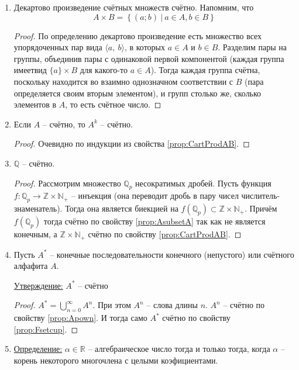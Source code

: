 \documentclass[a4paper, 12pt]{article}
\newcommand{\definition}{\underline{Определение:} }
\newcommand{\statement}{\underline{Утверждение:} }
\newcommand{\Z}{\mathbb{Z}}
\newcommand{\N}{\mathbb{N}}
\newcommand{\Q}{\mathbb{Q}}
\newcommand{\R}{\mathbb{R}}
\begin{document}
\begin{enumerate}
      \item
          \label{prop:CartProdAB}
          Декартово произведение счётных множеств счётно.
          Напомним, что \[A \times B = \left\{ (a; b)\ |\ a \in A, b \in B \right\}\]
          \begin{proof}
              По определению декартово произведение есть множество всех упорядоченных пар вида $\langle a,\ b\rangle$, в которых $a \in A$ и $b \in B$. Разделим пары на группы, объединив пары с одинаковой первой компонентой (каждая группа имеетвид $\{a\} \times B$ для какого-то $a \in A$). Тогда каждая группа счётна, поскольку находится во взаимно однозначном соответствии с $B$ (пара определяется своим вторым элементом), и групп столько же, сколько элементов в $A$, то есть счётное число.
          \end{proof}
      \item 
          \label{prop:Apown}
          Если $A$ -- счётно, то $A^k$ -- счётно.
          \begin{proof}
              Очевидно по индукции из свойства \ref{prop:CartProdAB}.
          \end{proof}
      \item $\Q$ -- счётно.
          \begin{proof}
              Рассмотрим множество $\Q_p$ несократимых дробей. 
              Пусть функция $f: \Q_p \to \Z \times \N_+$ -- инъекция
              (она переводит дробь в пару чисел числитель-знаменатель).
              Тогда она является биекцией на $f(\Q_p) \subset \Z \times \N_+$. 
              Причём $f(\Q_p)$ тогда счётно по свойству \ref{prop:AsubsetA}
              так как не является конечным, а $\Z \times \N_+$ счётно
              по свойству \ref{prop:CartProdAB}.
          \end{proof}
      \item Пусть $A^*$ -- конечные последовательности конечного (непустого) или 
          счётного алфафита $A$.

          \statement $A^*$ -- счётно
          \begin{proof}
              $A^* = \bigcup\limits_{n=0}^{\infty} A^n$. При этом $A^n$ -- слова длины $n$.
              $A^n$ -- счётно по свойству \ref{prop:Apown}. И тогда само $A^*$ счётно
              по свойству \ref{prop:Fsetcup}.
          \end{proof}
      \item \definition $\alpha \in \R$ -- алгебраическое число тогда и только тогда, 
          когда $\alpha$ -- корень некоторого многочлена с целыми коэфициентами.


\end{enumerate}
\end{document}
